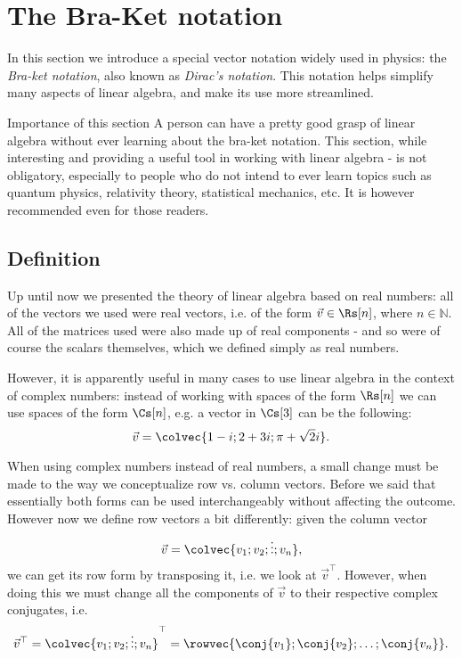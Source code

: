 \section{The Bra-Ket notation}

In this section we introduce a special vector notation widely used in physics: the \emph{Bra-ket notation}, also known as \emph{Dirac's notation}. This notation helps simplify many aspects of linear algebra, and make its use more streamlined.

\begin{note}{Importance of this section}{}
	A person can have a pretty good grasp of linear algebra without ever learning about the bra-ket notation. This section, while interesting and providing a useful tool in working with linear algebra - is not obligatory, especially to people who do not intend to ever learn topics such as quantum physics, relativity theory, statistical mechanics, etc. It is however recommended even for those readers.
\end{note}

\subsection{Definition}
Up until now we presented the theory of linear algebra based on real numbers: all of the vectors we used were real vectors, i.e. of the form $\vec{v}\in\Rs[n]$, where $n\in\mathbb{N}$. All of the matrices used were also made up of real components - and so were of course the scalars themselves, which we defined simply as real numbers.

However, it is apparently useful in many cases to use linear algebra in the context of complex numbers: instead of working with spaces of the form $\Rs[n]$ we can use spaces of the form $\Cs[n]$, e.g. a vector in $\Cs[3]$ can be the following:
\[
	\vec{v} = \colvec{1-i;2+3i;\pi+\sqrt{2}i}.
\]

When using complex numbers instead of real numbers, a small change must be made to the way we conceptualize row vs. column vectors. Before we said that essentially both forms can be used interchangeably without affecting the outcome. However now we define row vectors a bit differently: given the column vector
\begin{equation}
	\vec{v} = \colvec{v_{1};v_{2};\vdots;v_{n}},
	\label{eq:column_vector_complex}
\end{equation}
we can get its row form by transposing it, i.e. we look at $\vec{v}^{\top}$. However, when doing this we must change all the components of $\vec{v}$ to their respective complex conjugates, i.e.
\begin{equation}
	\vec{v}^{\top} = \colvec{v_{1};v_{2};\vdots;v_{n}}^{\top} = \rowvec{\conj{v_{1}};\conj{v_{2}};\dots;\conj{v_{n}}}.
	\label{eq:row_vector_complex}
\end{equation}


